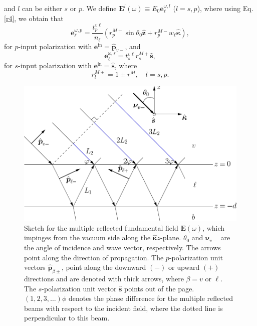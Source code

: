 and $l$ can be either $s$ or $p$. We define $\mathbf{E}^{l}(\omega)\equiv
E_{0}\mathbf{e}^{\omega,l}_\ell$ ($l=s,p$), where using Eq. \eqref{r4}, we
obtain that
\begin{equation}\label{mcvep}
\mathbf{e}^{\omega,p}_{\ell}=\frac{t^{v\ell}_{p}}{n_{\ell}}
\left( 
  r^{M+}_{p}\sin\theta_{0}\hat{\mathbf{z}}
+ r^{M-}_{p}w_{\ell}\hat{\boldsymbol{\kappa}}
\right),
\end{equation} 
for $p$-input polarization with
$\mathbf{e}^{\mathrm{in}}=\hat{\mathbf{p}}_{v-}$, and
\begin{equation}\label{mcves}
\mathbf{e}^{\omega,s}_\ell=t^{v\ell}_{s}r^{M+}_{s}\hat{\mathbf{s}},
\end{equation}
for $s$-input polarization with $\mathbf{e}^{\mathrm{in}}=\hat{\mathbf{s}}$,
where
\begin{equation}\label{mvc}
r^{M\pm}_{l}=1\pm r^{M},\quad l = s,p.
\end{equation}

\begin{figure}
\centering 
\includegraphics[scale=.5]{content/figures/diag-3layer_MR_1w}
\caption{Sketch for the multiple reflected fundamental field
$\mathbf{E}(\omega)$, which impinges from the vacuum side along the
$\hat{\boldsymbol{\kappa}}z$-plane. $\theta_{0}$ and $\boldsymbol{\nu}_{v-}$ are
the angle of incidence and wave vector, respectively. The arrows point along the
direction of propagation. The $p$-polarization unit vectors
$\hat{\mathbf{p}}_{\beta\pm}$, point along the downward $(-)$ or upward $(+)$
directions and are denoted with thick arrows, where $\beta = v$ or $\ell$. The
$s$-polarization unit vector $\hat{\mathbf{s}}$ points out of the page.
$(1,2,3,\ldots)\phi$ denotes the phase difference for the multiple reflected
beams with respect to the incident field, where the dotted line is perpendicular
to this beam.}
\label{fig:MR3layer1w}
\end{figure}


